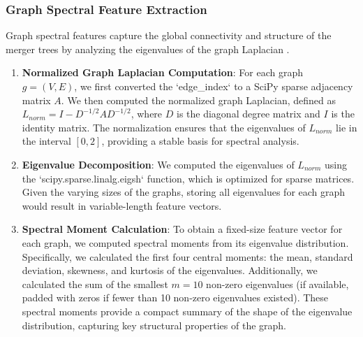 \documentclass[twocolumn]{aastex631}
\begin{document}
\subsubsection{Graph Spectral Feature Extraction}
Graph spectral features capture the global connectivity and structure of the merger trees by analyzing the eigenvalues of the graph Laplacian \citep{desouza2023graphbasedspectralclassificationtype,pavlou2023graphtheoreticalanalysislocal}.
\begin{enumerate}
    \item \textbf{Normalized Graph Laplacian Computation}: For each graph $g = (V, E)$, we first converted the `edge\_index` to a SciPy sparse adjacency matrix $A$. We then computed the normalized graph Laplacian, defined as $L_{norm} = I - D^{-1/2} A D^{-1/2}$, where $D$ is the diagonal degree matrix and $I$ is the identity matrix. The normalization ensures that the eigenvalues of $L_{norm}$ lie in the interval $[0, 2]$, providing a stable basis for spectral analysis.
    \item \textbf{Eigenvalue Decomposition}: We computed the eigenvalues of $L_{norm}$ using the `scipy.sparse.linalg.eigsh` function, which is optimized for sparse matrices. Given the varying sizes of the graphs, storing all eigenvalues for each graph would result in variable-length feature vectors.
    \item \textbf{Spectral Moment Calculation}: To obtain a fixed-size feature vector for each graph, we computed spectral moments from its eigenvalue distribution. Specifically, we calculated the first four central moments: the mean, standard deviation, skewness, and kurtosis of the eigenvalues. Additionally, we calculated the sum of the smallest $m=10$ non-zero eigenvalues (if available, padded with zeros if fewer than 10 non-zero eigenvalues existed). These spectral moments provide a compact summary of the shape of the eigenvalue distribution, capturing key structural properties of the graph.
\end{enumerate}
\end{document}
